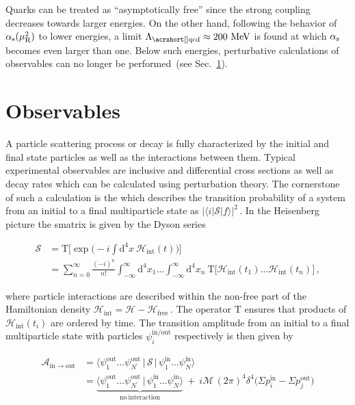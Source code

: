 Quarks can be treated as ``asymptotically free'' since the strong coupling decreases towards larger energies. On the other hand, following the behavior of ${\alpha_\textrm{s}}(\mu^2_\mathrm{R})$ to lower energies, a limit $\Lambda_\mathrm{\gls{qcd}}\approx 200~\MeV$ is found at which ${\alpha_\textrm{s}}$ becomes even larger than one. Below such energies, perturbative calculations of observables can no longer be performed~(see Sec.~\ref{sec:theory-observables}). 





\section{Observables}
\label{sec:theory-observables}

A particle scattering process or decay is fully characterized by the initial and final state particles as well as the interactions between them. Typical experimental observables are inclusive and differential cross sections as well as decay rates which can be calculated using perturbation theory. The cornerstone of such a calculation is the  which describes the transition probability of a system from an initial to a final multiparticle state as $|\langle i|\mathcal{S}|f\rangle|^{2}\,$. In the Heisenberg picture the \gls{smatrix} is given by the Dyson series

\begin{align}
\mathcal{S}&=\mathrm{T}\Big[\exp\Big(-i\int\mathrm{d}^{4}x~\mathcal{H}_\mathrm{int}(t)\Big)\Big]\nonumber\\
&=\sum_{n=0}^{\infty}\frac{(-i)^{n}}{n!}\int_{-\infty}^{\infty}\mathrm{d}^{4}x_{1}\ldots \int_{-\infty}^{\infty}\mathrm{d}^{4}x_{n}~\mathrm{T}\Big[\mathcal{H}_\mathrm{int}(t_{1})\ldots\mathcal{H}_\mathrm{int}(t_{n})\Big]\,, \label{eq:theory-dyson-series}
\end{align}

where particle interactions are described within the non-free part of the Hamiltonian density $\mathcal{H}_\mathrm{int}=\mathcal{H}-\mathcal{H}_\mathrm{free}\,$. The operator $\mathrm{T}$ ensures that products of $\mathcal{H}_\mathrm{int}(t_{i})$ are ordered by time. The transition amplitude from an initial to a final multiparticle state with particles $\psi_i^\mathrm{in/out}$ respectively is then given by

\begin{align}
\mathcal{A}_\mathrm{in\to out}&=\langle\psi_{1}^\mathrm{out}\ldots\psi_{N^{\prime}}^\mathrm{out}\,|\,\mathcal{S}\,|\,\psi_{1}^\mathrm{in}\ldots\psi_{N}^\mathrm{in}\rangle \\
&=\underbrace{\langle\psi_{1}^\mathrm{out}\ldots\psi_{N^{\prime}}^\mathrm{out}\,|\,\psi_{1}^\mathrm{in}\ldots\psi_{N}^\mathrm{in}\rangle}_\mathrm{no~interaction}~+~i\mathcal{M}\,(2\pi)^{4}\delta^{4}\big(\Sigma p^\mathrm{in}_{i}-\Sigma p^\mathrm{out}_{j}\big)
\end{align}


